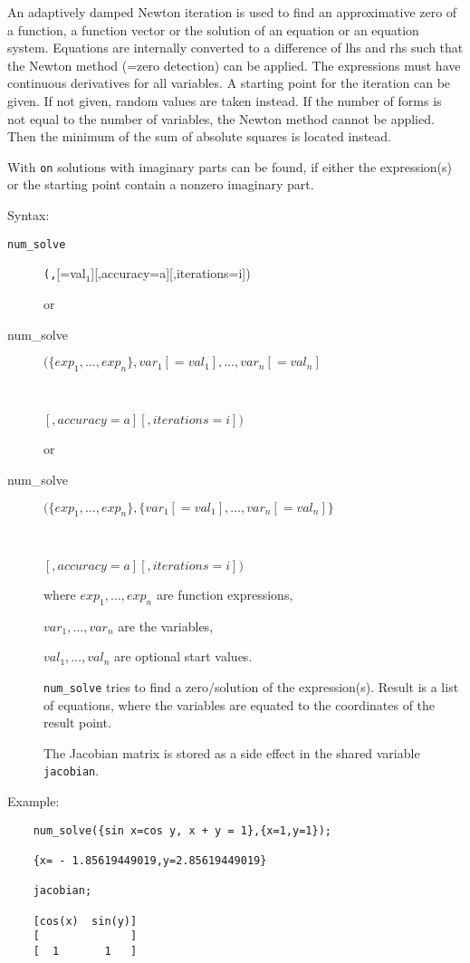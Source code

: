 An adaptively damped Newton iteration is used to find
an approximative zero of a function, a function vector or the solution
of an equation or an equation system. Equations are
internally converted to a difference of lhs and rhs such
that the Newton method (=zero detection) can be applied. The expressions
must have continuous derivatives for all variables.
A starting point for the iteration can be given. If not given,
random values are taken instead. If the number of
forms is not equal to the number of variables, the
Newton method cannot be applied. Then the minimum
of the sum of absolute squares is located instead.

With \texttt{on}  solutions with imaginary parts can be
found, if either the expression(s) or the starting point
contain a nonzero imaginary part.

Syntax:

\begin{description}
\item[\texttt{num\_solve}] \texttt{(}\texttt{,}[=val$_1$][,accuracy=a][,iterations=i])

or

\item[num\_solve]  $(\{exp_1,\ldots,exp_n\},
   var_1[=val_1],\ldots,var_n[=val_n]$
\item[\ \ \ \ \ \ \ \ ]$[,accuracy=a][,iterations=i])$

or

\item[num\_solve]  $(\{exp_1,\ldots,exp_n\},
   \{var_1[=val_1],\ldots,var_n[=val_n]\}$
\item[\ \ \ \ \ \ \ \ ]$[,accuracy=a][,iterations=i])$

where $exp_1, \ldots,exp_n$ are function expressions,

      $var_1, \ldots, var_n$ are the variables,

      $val_1, \ldots, val_n$ are optional start values.

\texttt{num\_solve} tries to find a zero/solution of the expression(s).
Result is a list of equations, where the variables are
equated to the coordinates of the result point.

\hypertarget{reserved:JACOBIAN}{}
The Jacobian matrix is stored as a side effect in the shared
variable \texttt{jacobian}.

\end{description}

Example:
\begin{verbatim}
    num_solve({sin x=cos y, x + y = 1},{x=1,y=1});

    {x= - 1.85619449019,y=2.85619449019}

    jacobian;

    [cos(x)  sin(y)]
    [              ]
    [  1       1   ]
\end{verbatim}

